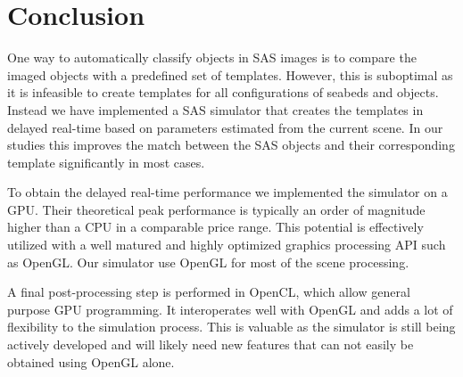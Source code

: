 \documentclass[
   UAM                                          %
 , 12pt                                         %
 , bibtex                                       %
 , layout
]{common/mytemplate}
\begin{document}
\section{Conclusion}

One way to automatically classify objects in SAS images is to compare the imaged objects with a predefined set of templates. However, this is suboptimal as it is infeasible to create templates for all configurations of seabeds and objects. Instead we have implemented a SAS simulator that creates the templates in delayed real-time based on parameters estimated from the current scene. In our studies this improves the match between the SAS objects and their corresponding template significantly in most cases.

To obtain the delayed real-time performance we implemented the simulator on a GPU. Their theoretical peak performance is typically an order of magnitude higher than a CPU in a comparable price range. This potential is effectively utilized with a well matured and highly optimized graphics processing API such as OpenGL. Our simulator use OpenGL for most of the scene processing.

A final post-processing step is performed in OpenCL, which allow general purpose GPU programming. It interoperates well with OpenGL and adds a lot of flexibility to the simulation process. This is valuable as the simulator is still being actively developed and will likely need new features that can not easily be obtained using OpenGL alone.

% 
% 
% 



% 

% 

% 
% 
\end{document}
